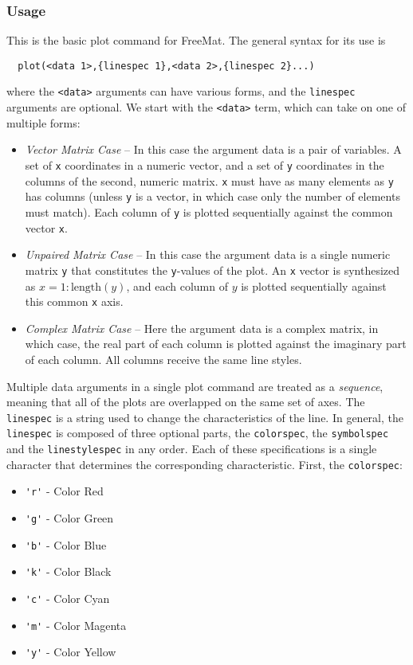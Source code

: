 \subsubsection{Usage}
This is the basic plot command for FreeMat.  The general syntax for its
use is
\begin{verbatim}
  plot(<data 1>,{linespec 1},<data 2>,{linespec 2}...)
\end{verbatim}
where the \verb|<data>| arguments can have various forms, and the
\verb|linespec| arguments are optional.  We start with the
\verb|<data>| term, which can take on one of multiple forms:
\begin{itemize}
  \item \emph{Vector Matrix Case} -- In this case the argument data is a pair
    of variables.  A set of \verb|x| coordinates in a numeric vector, and a 
    set of \verb|y| coordinates in the columns of the second, numeric matrix.
    \verb|x| must have as many elements as \verb|y| has columns (unless \verb|y|
    is a vector, in which case only the number of elements must match).  Each
    column of \verb|y| is plotted sequentially against the common vector \verb|x|.
  \item \emph{Unpaired Matrix Case} -- In this case the argument data is a 
    single numeric matrix \verb|y| that constitutes the \verb|y|-values
    of the plot.  An \verb|x| vector is synthesized as $x = 1:\mathrm{length}(y)$,
    and each column of $y$ is plotted sequentially against this common \verb|x|
    axis.
  \item \emph{Complex Matrix Case} -- Here the argument data is a complex
    matrix, in which case, the real part of each column is plotted against
    the imaginary part of each column.  All columns receive the same line
    styles.
\end{itemize}
Multiple data arguments in a single plot command are treated as a \emph{sequence}, meaning
that all of the plots are overlapped on the same set of axes.
The \verb|linespec| is a string used to change the characteristics of the line.  In general,
the \verb|linespec| is composed of three optional parts, the \verb|colorspec|, the 
\verb|symbolspec| and the \verb|linestylespec| in any order.  Each of these specifications
is a single character that determines the corresponding characteristic.  First, the 
\verb|colorspec|:
\begin{itemize}
  \item \verb|'r'| - Color Red
  \item \verb|'g'| - Color Green
  \item \verb|'b'| - Color Blue
  \item \verb|'k'| - Color Black
  \item \verb|'c'| - Color Cyan
  \item \verb|'m'| - Color Magenta
  \item \verb|'y'| - Color Yellow
\end{itemize}
